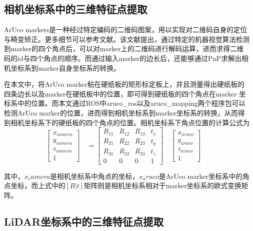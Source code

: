 
\subsection{相机坐标系中的三维特征点提取}

ArUco markers是一种经过特定编码的二维码图案，用以实现对二维码自身的定位与畸变矫正。更多细节可以参考文献。该文献提出，通过特定的机器视觉算法检测到marker的四个角点后，可以对marker上的二维码进行解码运算，进而求得二维码的id与四个角点的顺序。而通过输入marker的边长后，还能够通过PnP求解出相机坐标系到marker自身坐标系的转换。


在本文中，将ArUco marker粘在硬纸板的矩形标定板上，并且测量得出硬纸板的四条边长以及marker在硬纸板中的位置，即可得到硬纸板的四个角点在marker 坐标系中的位置。而本文通过ROS中aruco\_ros以及aruco\_mapping两个程序包可以检测ArUco marker的位置，进而得到相机坐标系到marker坐标系的转换，从而得到相机坐标系下的硬纸板的四个角点的位置。相机坐标系下角点位置的计算公式为
\begin{equation}
\begin{bmatrix} x_{camera}\\y_{camera}\\z_{camera}\\ 1 \end{bmatrix}\quad = \begin{bmatrix} R_{11}&R_{12}&R_{13}&t_x\\R_{21}&R_{22}&R_{23}&t_y\\R_{31}&R_{32}&R_{33}&t_z\\ 0&0&0&1 \end{bmatrix}\quad \begin{bmatrix} x_{aruco}\\y_{aruco}\\z_{aruco}\\ 1 \end{bmatrix}\quad
\end{equation}
    
其中，$x_camera$是相机坐标系中角点的坐标，$x_aruco$是ArUco marker坐标系中的角点坐标，而上式中的$[R|t]$矩阵则是相机坐标系相对于marker坐标系的欧式变换矩阵。

\subsection{LiDAR坐标系中的三维特征点提取}

